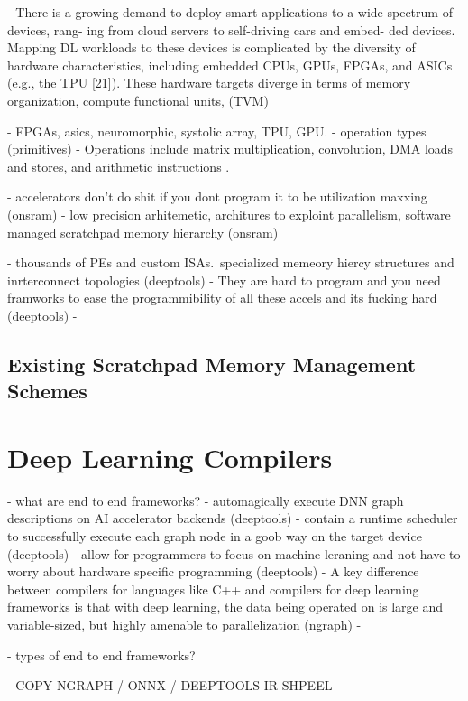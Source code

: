 - There is a growing demand to deploy smart applications to a wide spectrum of
devices, rang- ing from cloud servers to self-driving cars and embed- ded
devices. Mapping DL workloads to these devices is complicated by the diversity
of hardware characteristics, including embedded CPUs, GPUs, FPGAs, and ASICs
(e.g., the TPU [21]). These hardware targets diverge in terms of memory
organization, compute functional units, (TVM)

- FPGAs, asics, neuromorphic, systolic array, TPU, GPU. 
- operation types  (primitives)
	- Operations include matrix multiplication, convolution, DMA loads and stores, and arithmetic instructions \cite{tensorflow}.

- accelerators don't do shit if you dont program it to be utilization maxxing (onsram)
- low precision arhitemetic, architures to exploint parallelism, software managed scratchpad memory hierarchy (onsram)

- thousands of PEs and custom ISAs.\ specialized memeory hiercy structures and inrterconnect topologies (deeptools)
-  They are hard to program and you need framworks to ease the programmibility of all these accels and its fucking hard (deeptools)
- 

\subsection{Existing Scratchpad Memory Management Schemes}

\section{Deep Learning Compilers}

- what are end to end frameworks?
	- automagically execute DNN graph descriptions on AI accelerator
	backends (deeptools)
	- contain a runtime scheduler to successfully execute each graph node
	in a goob way on the target device (deeptools)
	- allow for programmers to focus on machine leraning and not have to
	worry about hardware specific programming (deeptools)
	- A key difference between compilers for languages
	like C++ and compilers for deep learning frameworks is that with
	deep learning, the data being operated on is large and variable-sized,
	but highly amenable to parallelization (ngraph)
	- 


- types of end to end frameworks?

- COPY NGRAPH / ONNX / DEEPTOOLS IR SHPEEL


